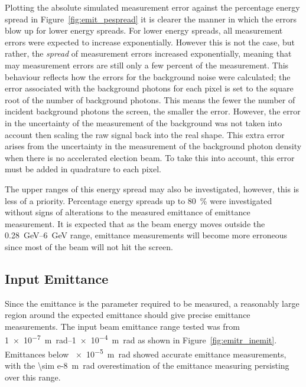Plotting the absolute simulated measurement error against the percentage energy
spread in Figure~\ref{fig:emit_pespread} it is clearer the manner in which the
errors blow up for lower energy spreads. 
For lower energy spreads, all measurement errors were expected to increase
exponentially.  However this is not the case, but rather, the \emph{spread} of
measurement errors increased exponentially, meaning that may measurement errors
are still only a few percent of the measurement. This behaviour reflects how the
errors for the background noise were calculated; the error associated with the
background photons for each pixel is set to the square root of the number of
background photons. This means the fewer the number of incident background
photons the screen, the smaller the error. However, the error in the uncertainty
of the measurement of the background was not taken into account then scaling the
raw signal back into the real shape. This extra error arises from the
uncertainty in the measurement of the background photon density when there is no
accelerated election beam. To take this into account, this error must be added
in quadrature to each pixel.

The upper ranges of this energy spread may also be investigated, however, this
is less of a priority. Percentage energy spreads up to \SI{80}{\percent} were
investigated without signs of alterations to the measured emittance of emittance
measurement. It is expected that as the beam energy moves outside the
\SIrange{0.28}{6}{\giga\electronvolt} range, emittance measurements will become
more erroneous since most of the beam will not hit the screen.

\subsection{Input Emittance}



Since the emittance is the parameter required to be measured, a reasonably large
region around the expected emittance should give precise emittance measurements.
The input beam emittance range tested was from \SIrange{1e-7}{1e-4}%
{\meter\radian} as shown in Figure~\ref{fig:emitr_inemit}. Emittances below
\SI{e-5}{\meter\radian} showed accurate emittance measurements, with the
\SI{\sim e-8}{\meter\radian} overestimation of the emittance measuring
persisting over this range.

